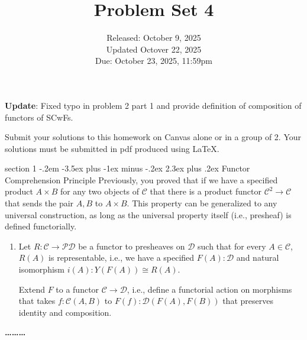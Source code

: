 \documentclass[12pt]{article}
\makeatletter
\newenvironment{problem}{\@startsection
       {section}
       {1}
       {-.2em}
       {-3.5ex plus -1ex minus -.2ex}
       {2.3ex plus .2ex}
       {\pagebreak[3]%
       \large\bf\noindent{Problem }
       }
       }
       {%
       \begin{center}\large\bf \ldots\ldots\ldots\end{center}}
\newcommand{\cat}{\mathcal}
\makeatother
\begin{document}
\title{Problem Set 4}
\date{Released: October 9, 2025\\
  Updated Octover 22, 2025\\
  Due: October 23, 2025, 11:59pm
}
\maketitle

\textbf{Update}: Fixed typo in problem 2 part 1 and provide definition of composition of functors of SCwFs.

Submit your solutions to this homework on Canvas alone or in a group of 2.
Your solutions must be submitted in pdf produced using LaTeX.

\begin{problem}{Functor Comprehension Principle}
  Previously, you proved that if we have a specified product $A \times
  B$ for any two objects of $\mathcal C$ that there is a product
  functor $\mathcal C^2 \to \mathcal C$ that sends the pair $A,B$ to
  $A \times B$. This property can be generalized to any universal
  construction, as long as the universal property itself (i.e.,
  presheaf) is defined functorially.

  \begin{enumerate}
  \item Let $R : \mathcal C \to \mathcal P\mathcal D$ be a functor to presheaves on $\cat D$
    such that for every $A \in \mathcal C$, $R(A)$ is representable,
    i.e., we have a specified $F(A) : \mathcal D$ and natural
    isomorphism $i(A) : Y(F(A)) \cong R(A)$.

    Extend $F$ to a functor $\mathcal C \to \mathcal D$, i.e., define
    a functorial action on morphisms that takes $f : \mathcal C(A,B)$
    to $F(f) : \mathcal D(F(A), F(B))$ that preserves identity and
    composition.
  \end{enumerate}
\end{problem}
\end{document}
